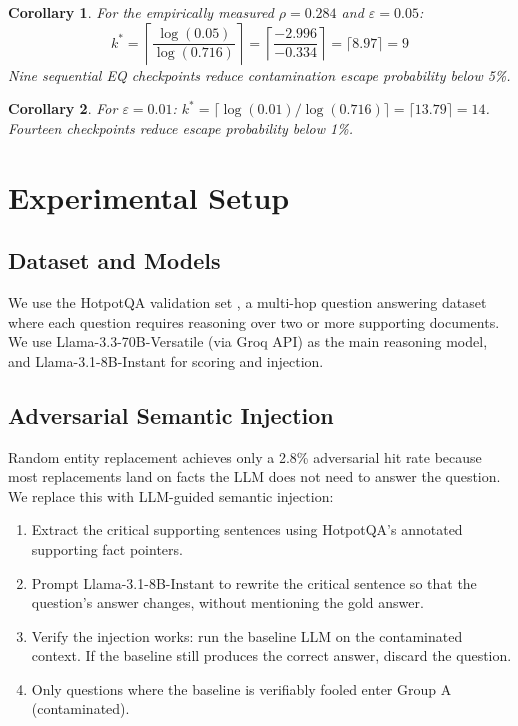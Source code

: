 \documentclass[11pt,a4paper]{article}
\newtheorem{corollary}{Corollary}
\begin{document}
\begin{corollary}
For the empirically measured $\rho = 0.284$ and $\varepsilon = 0.05$:
\[
k^* = \left\lceil \frac{\log(0.05)}{\log(0.716)} \right\rceil = \left\lceil \frac{-2.996}{-0.334} \right\rceil = \lceil 8.97 \rceil = 9
\]
Nine sequential EQ checkpoints reduce contamination escape probability below 5\%.
\end{corollary}

\begin{corollary}
For $\varepsilon = 0.01$:
$k^* = \lceil \log(0.01) / \log(0.716) \rceil = \lceil 13.79 \rceil = 14$.
Fourteen checkpoints reduce escape probability below 1\%.
\end{corollary}

\section{Experimental Setup}

\subsection{Dataset and Models}

We use the HotpotQA validation set \citep{yang2018hotpotqa}, a multi-hop question answering dataset where each question requires reasoning over two or more supporting documents. We use Llama-3.3-70B-Versatile (via Groq API) as the main reasoning model, and Llama-3.1-8B-Instant for scoring and injection.

\subsection{Adversarial Semantic Injection}

Random entity replacement achieves only a 2.8\% adversarial hit rate because most replacements land on facts the LLM does not need to answer the question. We replace this with LLM-guided semantic injection:

\begin{enumerate}
    \item Extract the critical supporting sentences using HotpotQA's annotated supporting fact pointers.
    \item Prompt Llama-3.1-8B-Instant to rewrite the critical sentence so that the question's answer changes, without mentioning the gold answer.
    \item Verify the injection works: run the baseline LLM on the contaminated context. If the baseline still produces the correct answer, discard the question.
    \item Only questions where the baseline is verifiably fooled enter Group A (contaminated).
\end{enumerate}
\end{document}
